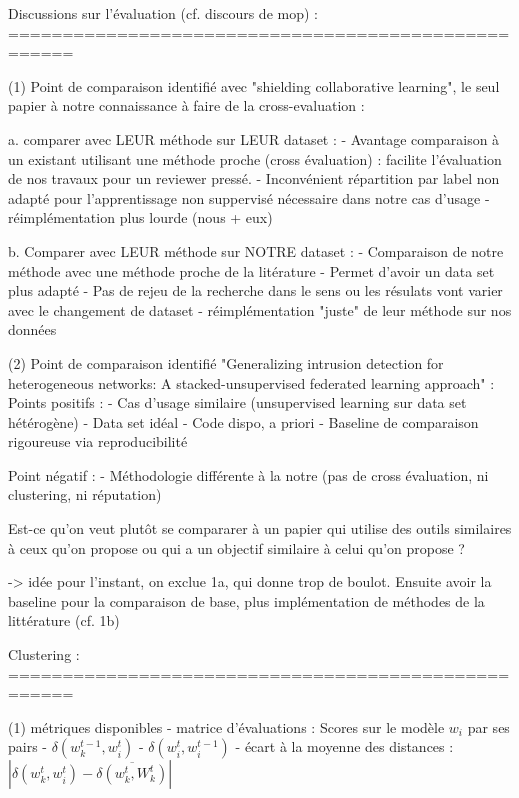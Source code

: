 Discussions sur l'évaluation (cf. discours de mop) :
====================================================

(1) Point de comparaison identifié avec "shielding collaborative learning", le seul papier à notre connaissance à faire de la cross-evaluation :

    a. comparer avec LEUR méthode sur LEUR dataset : 
	    - Avantage comparaison à un existant utilisant une méthode proche (cross évaluation) : facilite l'évaluation de nos travaux pour un reviewer pressé.  
	    - Inconvénient répartition par label non adapté pour l'apprentissage non suppervisé nécessaire dans notre cas d'usage
	    - réimplémentation plus lourde (nous + eux)

    b. Comparer avec LEUR méthode sur NOTRE dataset : 
        - Comparaison de notre méthode avec une méthode proche de la litérature
        - Permet d'avoir un data set plus adapté
        - Pas de rejeu de la recherche dans le sens ou les résulats vont varier avec le changement de dataset
        - réimplémentation "juste" de leur méthode sur nos données
        
(2) Point de comparaison identifié "Generalizing intrusion detection for heterogeneous networks: A stacked-unsupervised federated learning approach" :
    Points positifs : 
        - Cas d'usage similaire (unsupervised learning sur data set hétérogène)
        - Data set idéal 
        - Code dispo, a priori
        - Baseline de comparaison rigoureuse via reproducibilité 
        
    Point négatif :  
        - Méthodologie différente à la notre (pas de cross évaluation, ni clustering, ni réputation)
        

Est-ce qu'on veut plutôt se compararer à un papier qui utilise des outils similaires à ceux qu'on propose ou qui a un objectif similaire à celui qu'on propose ? 

-> idée pour l'instant, on exclue 1a, qui donne trop de boulot. Ensuite avoir la baseline pour la comparaison de base, plus implémentation de méthodes de la littérature (cf.  1b) 


Clustering :
====================================================


(1) métriques disponibles
    - matrice d'évaluations : Scores sur le modèle $w_i$ par ses pairs
    - $\delta ( w_k^{t-1} , w_i^t ) $
    - $\delta ( w_i^t , w_i^{t-1} ) $
    - écart à la moyenne des distances : $ | \delta ( w_k^t , w_i^t ) - \overline{ \delta ( w_k^t , W_k^t ) } | $
    
